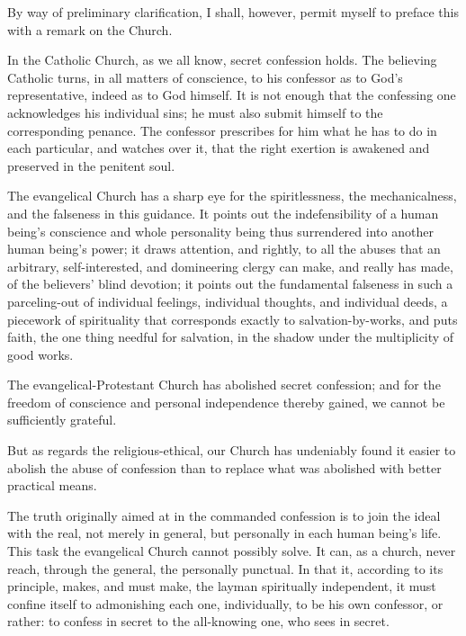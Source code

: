 \documentclass[12pt,a4paper]{book}
\begin{document}
By way of preliminary clarification, I shall, however, permit myself to preface this with a remark on the Church.

In the Catholic Church, as we all know, secret confession holds. The believing Catholic turns, in all matters of conscience, to his confessor as to God's representative, indeed as to God himself. It is not enough that the confessing one acknowledges his individual sins; he must also submit himself to the corresponding penance. The confessor prescribes for him what he has to do in each particular, and watches over it, that the right exertion is awakened and preserved in the penitent soul.

The evangelical Church has a sharp eye for the spiritlessness, the mechanicalness, and the falseness in this guidance. It points out the indefensibility of a human being's conscience and whole personality being thus surrendered into another human being's power; it draws attention, and rightly, to all the abuses that an arbitrary, self-interested, and domineering clergy can make, and really has made, of the believers' blind devotion; it points out the fundamental falseness in such a parceling-out of individual feelings, individual thoughts, and individual deeds, a piecework of spirituality that corresponds exactly to salvation-by-works, and puts faith, the one thing needful for salvation, in the shadow under the multiplicity of good works.

The evangelical-Protestant Church has abolished secret confession; and for the freedom of conscience and personal independence thereby gained, we cannot be sufficiently grateful.

But as regards the religious-ethical, our Church has undeniably found it easier to abolish the abuse of confession than to replace what was abolished with better practical means.

The truth originally aimed at in the commanded confession is to join the ideal with the real, not
merely in general, but personally in each human being's life. This task the evangelical Church cannot possibly solve. It can, as a church, never reach, through the general, the personally punctual. In that it, according to its principle, makes, and must make, the layman spiritually independent, it must confine itself to admonishing each one, individually, to be his own confessor, or rather: to confess in secret to the all-knowing one, who sees in secret.
\end{document}
